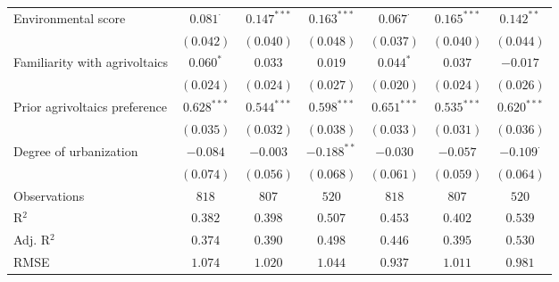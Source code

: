 \begin{center}
\begin{small}
\begin{longtable}{l@{} c@{} c@{} c@{} c@{} c@{} c@{}}
\quad Environmental score           & $0.081^{\cdot}$  & $0.147^{***}$ & $0.163^{***}$    & $0.067^{\cdot}$ & $0.165^{***}$ & $0.142^{**}$     \\
                                    & $(0.042)$        & $(0.040)$     & $(0.048)$        & $(0.037)$       & $(0.040)$     & $(0.044)$        \\
\quad Familiarity with agrivoltaics & $0.060^{*}$      & $0.033$       & $0.019$          & $0.044^{*}$     & $0.037$       & $-0.017$         \\
                                    & $(0.024)$        & $(0.024)$     & $(0.027)$        & $(0.020)$       & $(0.024)$     & $(0.026)$        \\
\quad Prior agrivoltaics preference & $0.628^{***}$    & $0.544^{***}$ & $0.598^{***}$    & $0.651^{***}$   & $0.535^{***}$ & $0.620^{***}$    \\
                                    & $(0.035)$        & $(0.032)$     & $(0.038)$        & $(0.033)$       & $(0.031)$     & $(0.036)$        \\
\quad Degree of urbanization        & $-0.084$         & $-0.003$      & $-0.188^{**}$    & $-0.030$        & $-0.057$      & $-0.109^{\cdot}$ \\
                                    & $(0.074)$        & $(0.056)$     & $(0.068)$        & $(0.061)$       & $(0.059)$     & $(0.064)$        \\
\hline
Observations                        & $818$            & $807$         & $520$            & $818$           & $807$         & $520$            \\
R$^2$                               & $0.382$          & $0.398$       & $0.507$          & $0.453$         & $0.402$       & $0.539$          \\
Adj. R$^2$                          & $0.374$          & $0.390$       & $0.498$          & $0.446$         & $0.395$       & $0.530$          \\
RMSE                                & $1.074$          & $1.020$       & $1.044$          & $0.937$         & $1.011$       & $0.981$          \\
\end{longtable}
\end{small}
\end{center}

